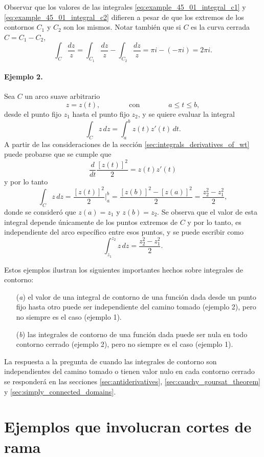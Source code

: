 \documentclass[a4paper]{report}
\begin{document}
Observar que los valores de las integrales \ref{eq:example_45_01_integral_c1} y \ref{eq:example_45_01_integral_c2} difieren a pesar de que los extremos de los contornos \(C_1\) y \(C_2\) son los mismos. Notar también que si \(C\) es la curva cerrada \(C=C_1-C_2\),
\[
 \int_C\frac{dz}{z}=\int_{C_1}\frac{dz}{z}-\int_{C_2}\frac{dz}{z}=\pi i-(-\pi i)=2\pi i.
\]

\paragraph{Ejemplo 2.} Sea \(C\) un arco suave arbitrario
\[
 z=z(t),\qquad\qquad\textrm{con}\qquad\qquad a\leq t\leq b,
\]
desde el punto fijo \(z_1\) hasta el punto fijo \(z_2\), y se quiere evaluar la integral
\[
 \int_C z\,dz=\int_a^bz(t)z'(t)\,dt.
\]
A partir de las consideraciones de la sección \ref{sec:integrals_derivatives_of_wt} puede probarse que se cumple que 
\[
 \frac{d}{dt}\frac{[z(t)]^2}{2}=z(t)z'(t)
\]
y por lo tanto
\[
 \int_C z\,dz=\frac{[z(t)]^2}{2}\bigg|_a^b=\frac{[z(b)]^2-[z(a)]^2}{2}=\frac{z_2^2-z_1^2}{2},
\]
donde se consideró que \(z(a)=z_1\) y \(z(b)=z_2\). Se observa que el valor de esta integral depende únicamente de los puntos extremos de \(C\) y por lo tanto, es independiente del arco específico entre esos puntos, y se puede escribir como
\[
 \int_{z_1}^{z_2}z\,dz=\frac{z_2^2-z_1^2}{2}.
\]

Estos ejemplos ilustran los siguientes importantes hechos sobre integrales de contorno:
\begin{enumerate}
 \item[(\textit{a})] el valor de una integral de contorno de una función dada desde un punto fijo hasta otro puede ser independiente del camino tomado (ejemplo 2), pero no siempre es el caso (ejemplo 1).
 \item[(\textit{b})] las integrales de contorno de una función dada puede ser nula en todo contorno cerrado (ejemplo 2), pero no siempre es el caso (ejemplo 1).
\end{enumerate}

La respuesta a la pregunta de cuando las integrales de contorno son independientes del camino tomado o tienen valor nulo en cada contorno cerrado se responderá en las secciones \ref{sec:antiderivatives}, \ref{sec:cauchy_goursat_theorem} y \ref{sec:simply_connected_domains}. 

\section{Ejemplos que involucran cortes de rama}\label{sec:integrals_examples_with_branch_cuts}
\end{document}
